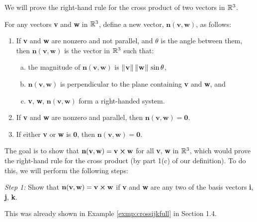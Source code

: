 We will prove the right-hand rule for the cross product of two vectors in $\mathbb{R}^{3}$.\\

\par\noindent For any vectors \textbf{v} and \textbf{w} in $\mathbb{R}^{3}$, define a new vector,
$\textbf{n}(\textbf{v},\textbf{w})$, as follows:
\begin{enumerate}
 \item If \textbf{v} and \textbf{w} are nonzero and not parallel, and $\theta$ is the angle between them, then
  $\textbf{n}(\textbf{v},\textbf{w})$ is the vector in $\mathbb{R}^{3}$ such that:
  \begin{enumerate}[(a)]
   \item the magnitude of $\textbf{n}(\textbf{v},\textbf{w})$ is $\lVert\mspace{1mu}\textbf{v}\mspace{1mu}\rVert\,\lVert\mspace{1mu}\textbf{w}\mspace{1mu}\rVert\,\sin \theta$,
   \item $\textbf{n}(\textbf{v},\textbf{w})$ is perpendicular to the plane containing \textbf{v} and \textbf{w}, and
   \item \textbf{v}, \textbf{w}, $\textbf{n}(\textbf{v},\textbf{w})$ form a right-handed system.
  \end{enumerate}
 \item If \textbf{v} and \textbf{w} are nonzero and parallel, then $\textbf{n}(\textbf{v},\textbf{w}) = \textbf{0}$.
 \item If either \textbf{v} or \textbf{w} is $\textbf{0}$, then $\textbf{n}(\textbf{v},\textbf{w}) = \textbf{0}$.
\end{enumerate}
The goal is to show that $\textbf{n}(\textbf{v},\textbf{w}) = \textbf{v} \bm{\times} \textbf{w}$ for all
\textbf{v}, \textbf{w} in $\mathbb{R}^{3}$, which would prove the right-hand rule for the cross product (by part 1(c) of
our definition). To do this, we will perform the following steps:\\

\par\noindent \emph{Step 1:} Show that $\textbf{n}(\textbf{v},\textbf{w}) = \textbf{v} \bm{\times} \textbf{w}$ if
\textbf{v} and \textbf{w} are any two of the basis vectors \textbf{i}, \textbf{j}, \textbf{k}.\vspace{1mm}
\par\noindent This was already shown in Example \ref{exmp:crossijkfull} in Section 1.4.\enskip\checkmark\\

